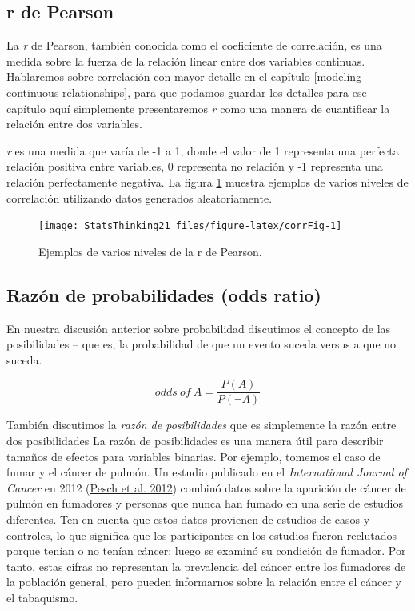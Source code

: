\documentclass[
  12pt,
]{book}
\begin{document}
\hypertarget{r-de-pearson}{%
\subsection{r de Pearson}\label{r-de-pearson}}

La \emph{r} de Pearson, también conocida como el coeficiente de correlación, es una medida sobre la fuerza de la relación linear entre dos variables continuas. Hablaremos sobre correlación con mayor detalle en el capítulo \ref{modeling-continuous-relationships}, para que podamos guardar los detalles para ese capítulo aquí simplemente presentaremos \emph{r} como una manera de cuantificar la relación entre dos variables.

\emph{r} es una medida que varía de -1 a 1, donde el valor de 1 representa una perfecta relación positiva entre variables, 0 representa no relación y -1 representa una relación perfectamente negativa. La figura \ref{fig:corrFig} muestra ejemplos de varios niveles de correlación utilizando datos generados aleatoriamente.

\begin{figure}
\texttt{[image: StatsThinking21\_files/figure-latex/corrFig-1]} \caption{Ejemplos de varios niveles de la r de Pearson.}\label{fig:corrFig}
\end{figure}

\hypertarget{razuxf3n-de-probabilidades-odds-ratio}{%
\subsection{Razón de probabilidades (odds ratio)}\label{razuxf3n-de-probabilidades-odds-ratio}}

En nuestra discusión anterior sobre probabilidad discutimos el concepto de las posibilidades -- que es, la probabilidad de que un evento suceda versus a que no suceda.

\[
odds\ of\ A = \frac{P(A)}{P(\neg A)}
\]

También discutimos la \emph{razón de posibilidades} que es simplemente la razón entre dos posibilidades La razón de posibilidades es una manera útil para describir tamaños de efectos para variables binarias.
Por ejemplo, tomemos el caso de fumar y el cáncer de pulmón. Un estudio publicado en el \emph{International Journal of Cancer} en 2012 (\protect\hyperlink{ref-pesc:kend:gust:2012}{Pesch et al. 2012}) combinó datos sobre la aparición de cáncer de pulmón en fumadores y personas que nunca han fumado en una serie de estudios diferentes. Ten en cuenta que estos datos provienen de estudios de casos y controles, lo que significa que los participantes en los estudios fueron reclutados porque tenían o no tenían cáncer; luego se examinó su condición de fumador. Por tanto, estas cifras no representan la prevalencia del cáncer entre los fumadores de la población general, pero pueden informarnos sobre la relación entre el cáncer y el tabaquismo.
\end{document}
